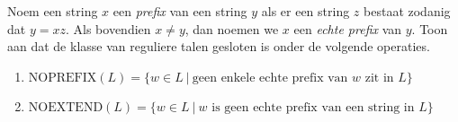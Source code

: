 \documentclass[a4paper]{article}
\begin{document}
\begin{question}
Noem een string $x$ een \emph{prefix} van een string $y$ als er een string $z$ bestaat zodanig dat $y = xz$. Als bovendien $x \neq y$, dan noemen we $x$ een \emph{echte prefix} van $y$. Toon aan dat de klasse van reguliere talen gesloten is onder de volgende operaties.
\begin{enumerate}
  \item $\mathrm{NOPREFIX} (L) = \{ w \in L \ | \ \mbox{geen enkele echte prefix van $w$ zit in $L$} \}$
  \item $\mathrm{NOEXTEND} (L) = \{ w \in L \ | \ \mbox{$w$ is geen echte prefix van een string in $L$} \}$
\end{enumerate}
\end{question}
\end{document}
